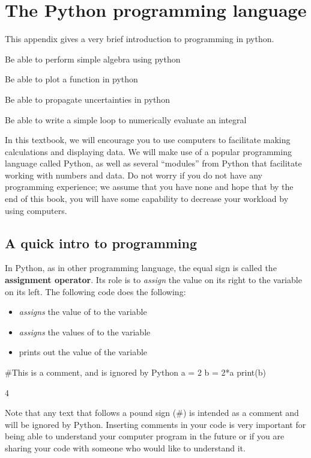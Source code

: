 \chapter{The Python programming language}
\label{app:python}
This appendix gives a very brief introduction to programming in python. 
 \vspace{1cm}
\begin{learningObjectives}
\item Be able to perform simple algebra using python
\item Be able to plot a function in python
\item Be able to propagate uncertainties in python
\item Be able to write a simple loop to numerically evaluate an integral
\end{learningObjectives}

In this textbook, we will encourage you to use computers to facilitate making calculations and displaying data. We will make use of a popular programming language called Python, as well as several ``modules'' from Python that facilitate working with numbers and data. Do not worry if you do not have any programming experience; we assume that you have none and hope that by the end of this book, you will have some capability to decrease your workload by using computers.

\section{A quick intro to programming}
In Python, as in other programming language, the equal sign is called the \textbf{assignment operator}. Its role is to \textit{assign} the value on its right to the variable on its left. The following code does the following:
\begin{itemize}
\item \textit{assigns} the value of  to the variable 
\item \textit{assigns} the values of  to the variable 
\item prints out the value of the variable 
\end{itemize}

\begin{python}[caption=Declaring variables in Python] 
#This is a comment, and is ignored by Python
a = 2 
b = 2*a
print(b)
\end{python}
\begin{poutput}
4
\end{poutput}
Note that any text that follows a pound sign (\#) is intended as a comment and will be ignored by Python. Inserting comments in your code is very important for being able to understand your computer program in the future or if you are sharing your code with someone who would like to understand it.


